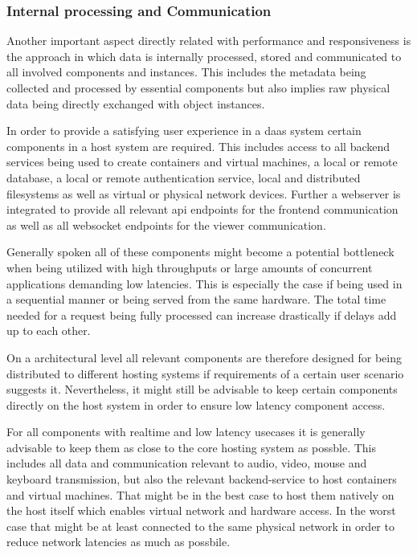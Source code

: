 \documentclass[runningheads]{llncs}
\begin{document}
\subsubsection{Internal processing and Communication}
Another important aspect directly related with performance and responsiveness
is the approach in which data is internally processed, stored and communicated
to all involved components and instances.
This includes the metadata being collected and processed by essential components
but also implies raw physical data being directly exchanged with object instances.

In order to provide a satisfying user experience in a daas system
certain components in a host system are required.
This includes access to all backend services
being used to create containers and virtual machines,
a local or remote database, a local or remote authentication service,
local and distributed filesystems as well as
virtual or physical network devices.
Further a webserver is integrated to provide all relevant api endpoints
for the frontend communication
as well as all websocket endpoints for the viewer communication.

Generally spoken all of these components might become a potential bottleneck
when being utilized with high throughputs
or large amounts of concurrent applications demanding low latencies.
This is especially the case if being used in a sequential manner
or being served from the same hardware.
The total time needed for a request being fully processed
can increase drastically if delays add up to each other.

On a architectural level all relevant components are therefore designed
for being distributed to different hosting systems
if requirements of a certain user scenario suggests it.
Nevertheless, it might still be advisable
to keep certain components directly on the host system
in order to ensure low latency component access.

For all components with realtime and low latency usecases it is generally advisable
to keep them as close to the core hosting system as possble.
This includes all data and communication
relevant to audio, video, mouse and keyboard transmission,
but also the relevant backend-service to host containers and virtual machines.
That might be in the best case to host them natively on the host itself
which enables virtual network and hardware access.
In the worst case that might be at least connected to the same physical network
in order to reduce network latencies as much as possbile.
\end{document}

